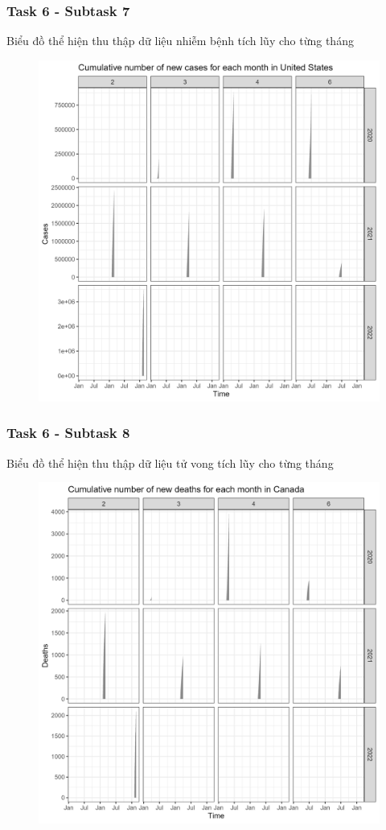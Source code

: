 \documentclass[english,10pt,table]{beamer}
\begin{document}
\frame
{
    \frametitle{Task 6 - Subtask 7}
    \begin{block}{Biểu đồ thể hiện thu thập dữ liệu nhiễm bệnh tích lũy cho từng tháng}
    \begin{figure}[H]
		\centering
		\includegraphics[scale=0.105]{images/6.7.3.png}
	\end{figure}
    \end{block}
}
\frame
{
    \frametitle{Task 6 - Subtask 8}
    \begin{block}{Biểu đồ thể hiện thu thập dữ liệu tử vong tích lũy cho từng tháng}
    \begin{figure}[H]
		\centering
		\includegraphics[scale=0.11]{images/6.8.1.png}
	\end{figure}
    \end{block}
}
\end{document}
